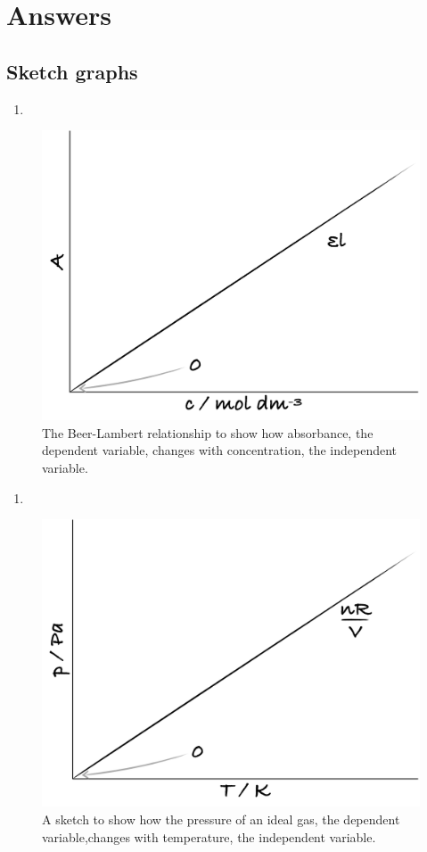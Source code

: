 \documentclass[
]{book}
\begin{document}
\hypertarget{sec:Answers3}{%
\section{Answers}\label{sec:Answers3}}

\hypertarget{subsec:sketchans}{%
\subsection{Sketch graphs}\label{subsec:sketchans}}

\begin{enumerate}
\def\labelenumi{\arabic{enumi}.}
\item
\end{enumerate}

\begin{figure}

{\centering \includegraphics[width=0.3\linewidth]{images/abssketch} 

}

\caption{The Beer-Lambert relationship to show how absorbance, the dependent variable, changes with concentration, the independent variable.}\label{fig:abs}
\end{figure}

\begin{enumerate}
\def\labelenumi{\arabic{enumi}.}
\setcounter{enumi}{1}
\item
\end{enumerate}

\begin{figure}

{\centering \includegraphics[width=0.3\linewidth]{images/pTsketch} 

}

\caption{A sketch to show how the pressure of an ideal gas, the dependent variable,changes with temperature, the independent variable.}\label{fig:pT}
\end{figure}
\end{document}
